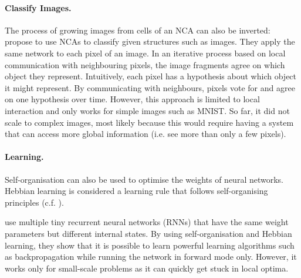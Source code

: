\paragraph{Classify Images.} The process of growing images from cells of an NCA can also be inverted:
 propose to use NCAs to classify given structures such as images.
They apply the same network to each pixel of an image.
In an iterative process based on local communication with neighbouring pixels, the image fragments agree on which object they represent.
Intuitively, each pixel has a hypothesis about which object it might represent. By communicating with neighbours, pixels vote for and agree on one hypothesis over time.
However, this approach is limited to local interaction and only works for simple images such as MNIST. So far, it did not scale to complex images, most likely because this would require having a system that can access more global information (i.e. see more than only a few pixels).

\paragraph{Learning.} Self-organisation can also be used to optimise the weights of neural networks.
Hebbian learning is considered a learning rule that follows self-organising principles  (c.f. ).

 use multiple tiny recurrent neural networks (RNNs) that have the same weight parameters but different internal states.
By using self-organisation and Hebbian learning, they show that it is possible to learn powerful learning algorithms such as backpropagation while running the network in forward mode only.
However, it works only for small-scale problems as it can quickly get stuck in local optima.



